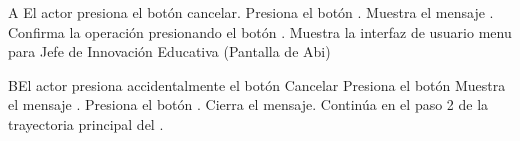 

\begin{UCtrayectoriaA}{A}{ El actor presiona el botón cancelar.}
	\UCpaso[\UCactor] Presiona el botón .
    \UCpaso Muestra el mensaje .
    \UCpaso[\UCactor] Confirma la operación presionando el botón .
    \UCpaso Muestra la interfaz de usuario menu para Jefe de Innovación Educativa (Pantalla de Abi)
\end{UCtrayectoriaA}



\begin{UCtrayectoriaA}{B}{El actor presiona accidentalmente el botón Cancelar}
	\UCpaso[\UCactor] Presiona el botón 
    \UCpaso Muestra el mensaje .
    \UCpaso[\UCactor] Presiona el botón .
    \UCpaso Cierra el mensaje.
    \UCpaso Continúa en el paso 2 de la trayectoria principal del .
\end{UCtrayectoriaA}


